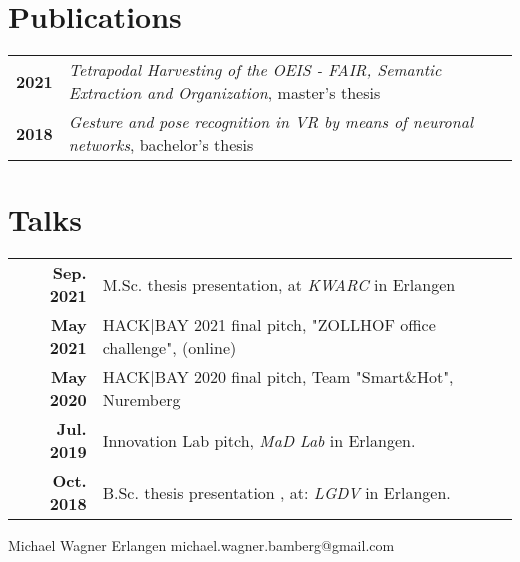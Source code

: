 \documentclass[michiscolours]{hipstercv}
\newlength{\rightcolwidth}
\begin{document}
\begin{paracol}{2}
\begin{minipage}[t]{0.3\textwidth}
\begin{tabular}{>{\footnotesize\bfseries}r >{\footnotesize}p{}}
\end{tabular}
\end{minipage}\hfill
\begin{minipage}[t]{0.3\textwidth}
\section*{Publications}
\begin{tabular}{>{\footnotesize\bfseries}r >{\footnotesize}p{}}
    2021 & \emph{Tetrapodal Harvesting of the OEIS - FAIR, Semantic Extraction and Organization}, master's thesis \\
    2018 & \emph{Gesture and pose recognition in VR by means of neuronal networks}, bachelor's thesis 
\end{tabular}
\section*{Talks}
\begin{tabular}{>{\footnotesize\bfseries}r >{\footnotesize}p{}}
    Sep. 2021& M.Sc. thesis presentation, at \emph{KWARC} in Erlangen \\
    May 2021& HACK|BAY 2021 final pitch, "ZOLLHOF office challenge",  (online) \\
    May 2020& HACK|BAY 2020 final pitch, Team "Smart\&Hot", Nuremberg \\
    Jul. 2019& Innovation Lab pitch, \emph{MaD Lab} in Erlangen.\\
    Oct. 2018& B.Sc. thesis presentation , at: \emph{LGDV} in Erlangen. \\
\end{tabular}
\end{minipage}


\vfill{} %
\setlength{\parindent}{0pt}
\begin{minipage}[t]{\rightcolwidth}
\begin{center}\fontfamily{\sfdefault}\selectfont \color{black!70}
{
\small Michael Wagner 
 Erlangen 
 michael.wagner.bamberg@gmail.com \newline 

}
\end{center}
\end{minipage}
\end{paracol}
\end{document}
